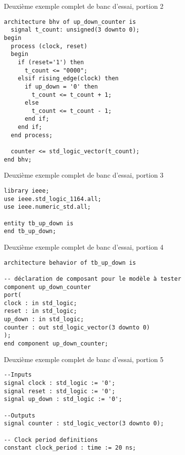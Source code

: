 \documentclass[presentation]{beamer}
\begin{document}
\begin{frame}[label={sec:org813ff65},fragile]{Deuxième exemple complet de banc d'essai, portion 2}
 \begin{verbatim}
architecture bhv of up_down_counter is
  signal t_count: unsigned(3 downto 0);
begin
  process (clock, reset)
  begin
    if (reset='1') then
      t_count <= "0000";
    elsif rising_edge(clock) then
      if up_down = '0' then
        t_count <= t_count + 1;
      else
        t_count <= t_count - 1;
      end if;
    end if;
  end process;

  counter <= std_logic_vector(t_count);
end bhv;
\end{verbatim}
\end{frame}

\begin{frame}[label={sec:orgbc7c6e8},fragile]{Deuxième exemple complet de banc d'essai, portion 3}
 \begin{verbatim}
library ieee;
use ieee.std_logic_1164.all;
use ieee.numeric_std.all;

entity tb_up_down is
end tb_up_down;
\end{verbatim}
\end{frame}

\begin{frame}[label={sec:orgaeba643},fragile]{Deuxième exemple complet de banc d'essai, portion 4}
 \begin{verbatim}
architecture behavior of tb_up_down is

-- déclaration de composant pour le modèle à tester
component up_down_counter
port(
clock : in std_logic;
reset : in std_logic;
up_down : in std_logic;
counter : out std_logic_vector(3 downto 0)
);
end component up_down_counter;

\end{verbatim}
\end{frame}

\begin{frame}[label={sec:org410daf0},fragile]{Deuxième exemple complet de banc d'essai, portion 5}
 \begin{verbatim}
--Inputs
signal clock : std_logic := '0';
signal reset : std_logic := '0';
signal up_down : std_logic := '0';

--Outputs
signal counter : std_logic_vector(3 downto 0);

-- Clock period definitions
constant clock_period : time := 20 ns;
\end{verbatim}
\end{frame}
\end{document}

